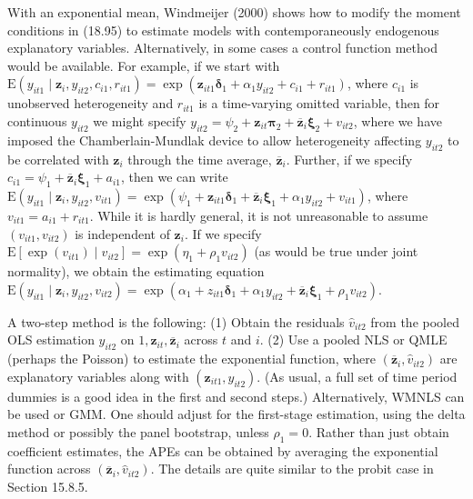 \documentclass[10pt]{article}
\begin{document}
With an exponential mean, Windmeijer (2000) shows how to modify the moment conditions in (18.95) to estimate models with contemporaneously endogenous explanatory variables. Alternatively, in some cases a control function method would be available. For example, if we start with $\mathrm{E}\left(y_{i t 1} \mid \mathbf{z}_{i}, y_{i t 2}, c_{i 1}, r_{i t 1}\right)=\exp \left(\mathbf{z}_{i t 1} \boldsymbol{\delta}_{1}+\alpha_{1} y_{i t 2}+\right. \left.c_{i 1}+r_{i t 1}\right)$, where $c_{i 1}$ is unobserved heterogeneity and $r_{i t 1}$ is a time-varying omitted variable, then for continuous $y_{i t 2}$ we might specify $y_{i t 2}=\psi_{2}+\mathbf{z}_{i t} \boldsymbol{\pi}_{2}+\overline{\mathbf{z}}_{i} \boldsymbol{\xi}_{2}+v_{i t 2}$, where we have imposed the Chamberlain-Mundlak device to allow heterogeneity affecting $y_{i t 2}$ to be correlated with $\mathbf{z}_{i}$ through the time average, $\overline{\mathbf{z}}_{i}$. Further, if we specify $c_{i 1}=\psi_{1}+\overline{\mathbf{z}}_{i} \boldsymbol{\xi}_{1}+a_{i 1}$, then we can write $\mathrm{E}\left(y_{i t 1} \mid \mathbf{z}_{i}, y_{i t 2}, v_{i t 1}\right)=\exp \left(\psi_{1}+\right. \left.\mathbf{z}_{i t 1} \boldsymbol{\delta}_{1}+\overline{\mathbf{z}}_{i} \boldsymbol{\xi}_{1}+\alpha_{1} y_{i t 2}+v_{i t 1}\right)$, where $v_{i t 1}=a_{i 1}+r_{i t 1}$. While it is hardly general, it is not unreasonable to assume $\left(v_{i t 1}, v_{i t 2}\right)$ is independent of $\mathbf{z}_{i}$. If we specify $\mathrm{E}\left[\exp \left(v_{i t 1}\right) \mid v_{i t 2}\right]=\exp \left(\eta_{1}+\rho_{1} v_{i t 2}\right)$ (as would be true under joint normality), we obtain the estimating equation\\
$\mathrm{E}\left(y_{i t 1} \mid \mathbf{z}_{i}, y_{i t 2}, v_{i t 2}\right)=\exp \left(\alpha_{1}+z_{i t 1} \boldsymbol{\delta}_{1}+\alpha_{1} y_{i t 2}+\overline{\mathbf{z}}_{i} \boldsymbol{\xi}_{1}+\rho_{1} v_{i t 2}\right)$.

A two-step method is the following: (1) Obtain the residuals $\hat{v}_{i t 2}$ from the pooled OLS estimation $y_{i t 2}$ on $1, \mathbf{z}_{i t}, \overline{\mathbf{z}}_{i}$ across $t$ and $i$. (2) Use a pooled NLS or QMLE (perhaps the Poisson) to estimate the exponential function, where $\left(\overline{\mathbf{z}}_{i}, \hat{v}_{i t 2}\right)$ are explanatory variables along with $\left(\mathbf{z}_{i t 1}, y_{i t 2}\right)$. (As usual, a full set of time period dummies is a good idea in the first and second steps.) Alternatively, WMNLS can be used or GMM. One should adjust for the first-stage estimation, using the delta method or possibly the panel bootstrap, unless $\rho_{1}=0$. Rather than just obtain coefficient estimates, the APEs can be obtained by averaging the exponential function across $\left(\overline{\mathbf{z}}_{i}, \hat{v}_{i t 2}\right)$. The details are quite similar to the probit case in Section 15.8.5.
\end{document}
